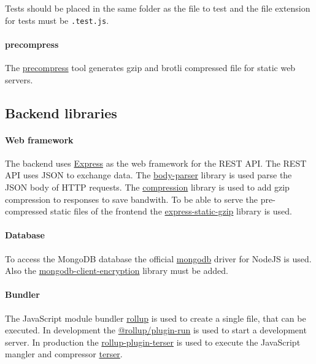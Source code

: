 Tests should be placed in the same folder as the file to test and the file extension for tests must be \texttt{.test.js}.

\paragraph{precompress}
The \href{https://www.npmjs.com/package/precompress}{precompress} tool generates gzip and brotli compressed file for static web servers.

\subsection{Backend libraries}

\paragraph{Web framework}
The backend uses \href{https://expressjs.com}{Express} as the web framework for the REST API.
The REST API uses JSON to exchange data.
The \href{https://www.npmjs.com/package/body-parser}{body-parser} library is used parse the JSON body of HTTP requests.
The \href{https://www.npmjs.com/package/compression}{compression} library is used to add gzip compression to responses to save bandwith.
To be able to serve the pre-compressed static files of the frontend the \href{https://www.npmjs.com/package/express-static-gzip}{express-static-gzip} library is used.

\paragraph{Database}
To access the MongoDB database the official \href{https://www.npmjs.com/package/mongodb}{mongodb} driver for NodeJS is used.
Also the \href{https://www.npmjs.com/package/mongodb-client-encryption}{mongodb-client-encryption} library must be added.

\paragraph{Bundler}
The JavaScript module bundler \href{https://rollupjs.org}{rollup} is used to create a single file, that can be executed.
In development the \href{https://www.npmjs.com/package/@rollup/plugin-run}{@rollup/plugin-run} is used to start a development server.
In production the \href{https://www.npmjs.com/package/rollup-plugin-terser}{rollup-plugin-terser} is used to execute the JavaScript mangler and compressor \href{https://terser.org}{terser}.
